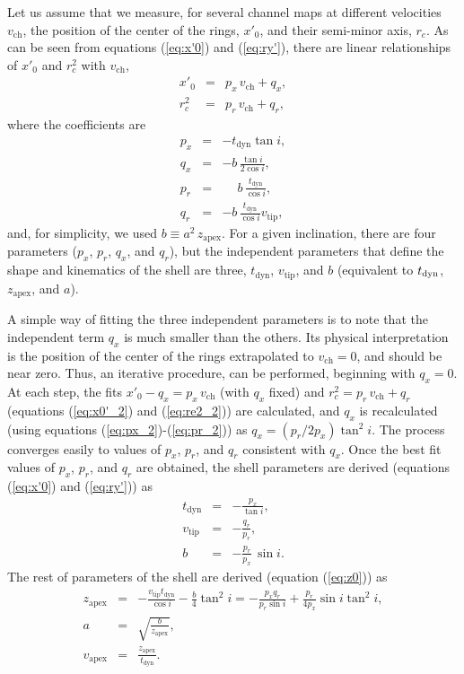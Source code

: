 \documentclass[12pt]{mythesis}
\begin{document}
Let us assume that we measure, for several channel maps at different velocities $v_\mathrm{ch}$,
the position of the center of the rings, $x'_0$, 
and their semi-minor axis, $r_c$.
As can be seen from equations (\ref{eq:x'0}) and (\ref{eq:ry'}), there are linear relationships of $x'_0$ and $r_c^2$ with $v_\mathrm{ch}$,
\begin{eqnarray}     %
	x'_0  &=& p_x\, v_\mathrm{ch}+q_x,\label{eq:x0'_2} \\
r_c^2 &=& p_r\, v_\mathrm{ch}+q_r,\label{eq:re2_2}
\end{eqnarray}
where the coefficients are
\begin{eqnarray}
p_x &=& -t_\mathrm{dyn} \tan i,\label{eq:px_2} \\
q_x &=& -b\,\frac{\tan i}{2\cos i},\label{eq:qx_2} \\
p_r &=& \phantom{-} b\,\frac{t_\mathrm{dyn}}{\cos i},\label{eq:pr_2}\\
q_r &=& -b\,\frac{t_\mathrm{dyn}}{\cos i}v_\mathrm{tip},
\end{eqnarray}
and, for simplicity, we used $b\equiv a^2\,z_\mathrm{apex}$.
For a given inclination, there are four parameters ($p_x$, $p_r$, $q_x$, and $q_r$), but the independent parameters that define the shape and kinematics of the shell are three, $t_\mathrm{dyn}$, $v_\mathrm{tip}$, and $b$ (equivalent to $t_{\rm dyn}$, $z_\mathrm{apex}$, and $a$).

A simple way of fitting the three independent parameters is to note that the independent term $q_x$ is much smaller than the others.
Its physical interpretation is the position of the center of the rings extrapolated to $v_\mathrm{ch}=0$, and should be near zero.
Thus, an iterative procedure, can be performed, beginning with $q_x=0$.
At each step, the fits $x'_0-q_x= p_x\, v_\mathrm{ch}$ (with $q_x$ fixed) and $r_c^2= p_r\, v_\mathrm{ch}+q_r$ (equations (\ref{eq:x0'_2}) and (\ref{eq:re2_2})) are calculated, 
and $q_x$ is recalculated (using equations (\ref{eq:px_2})-(\ref{eq:pr_2})) as $q_x= (p_r/2p_x)\tan^2 i$.
The process converges easily to values of $p_x$, $p_r$, and $q_r$ consistent with $q_x$.
Once the best fit values of $p_x$, $p_r$, and $q_r$ are obtained, the shell parameters are derived (equations (\ref{eq:x'0}) and (\ref{eq:ry'})) as
\begin{eqnarray}
t_\mathrm{dyn} &=& -\frac{p_x}{\tan i}, \\
v_\mathrm{tip} &=& -\frac{q_r}{p_r}, \\
b          &=& -\frac{p_r}{p_x}\,\sin i.
\end{eqnarray}
The rest of parameters of the shell are derived (equation (\ref{eq:z0})) as
\begin{eqnarray}
	z_\mathrm{apex} &=& -\frac{v_\mathrm{tip} t_\mathrm{dyn}}{\cos i} -\frac{b}{4} \tan^2 i= 
-\frac{p_x q_r}{p_r \sin i} +\frac{p_r}{4 p_x} \sin i \tan^2 i, \\
a   &=& \sqrt{\frac{b}{z_\mathrm{apex}}}, \\
v_\mathrm{apex} &=& \frac{z_\mathrm{apex}}{t_\mathrm{dyn}}. 
\end{eqnarray}
\end{document}
